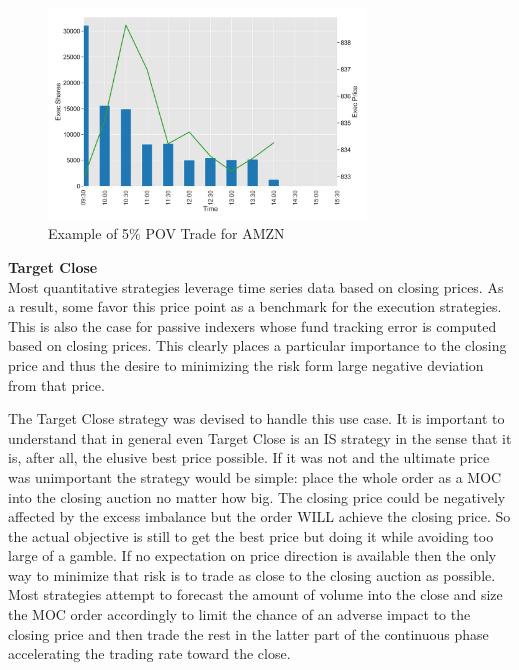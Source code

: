 	\begin{figure}[!ht]
	\centering
	\includegraphics[width=0.75\textwidth]{chapters/chapter_exec_models/figures/pov.png} 
	\caption{Example of 5\% POV Trade for AMZN \label{fig:pov}}
	\end{figure}


\noindent\textbf{Target Close} \\

Most quantitative strategies leverage time series data based on closing prices. As a result, some favor this price point as a benchmark for the execution strategies. This is also the case for passive indexers whose fund tracking error is computed based on closing prices. This clearly places a particular importance to the closing price and thus the desire to minimizing the risk form large negative deviation from that price.


The Target Close strategy was devised to handle this use case. It is important to understand that in general even Target Close is an IS strategy in the sense that it is, after all, the elusive best price possible. If it was not and the ultimate price was unimportant the strategy would be simple: place the whole order as a MOC into the closing auction no matter how big. The closing price could be negatively affected by the excess imbalance but the order WILL achieve the closing price. So the actual objective is still to get the best price but doing it while avoiding too large of a gamble. If no expectation on price direction is available then the only way to minimize that risk is to trade as close to the closing auction as possible. Most strategies attempt to forecast the amount of volume into the close and size the MOC order accordingly to limit the chance of an adverse impact to the closing price and then trade the rest in the latter part of the continuous phase accelerating the trading rate toward the close. \\

